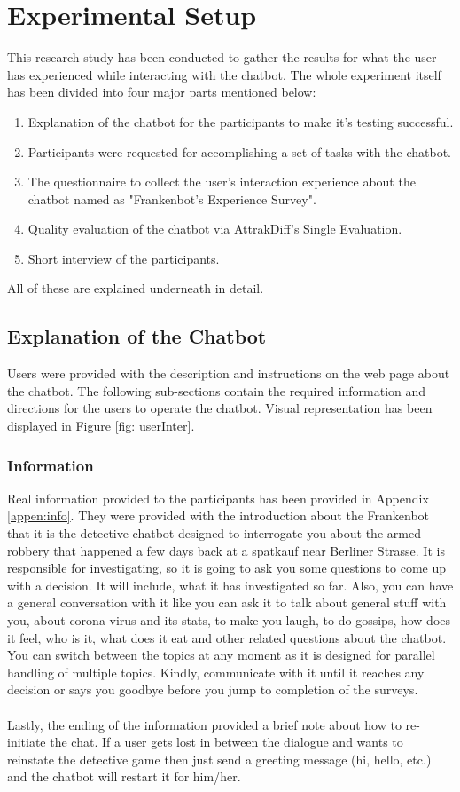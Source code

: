 \section{Experimental Setup}
This research study has been conducted to gather the results for what the user has experienced while interacting with the chatbot. The whole experiment itself has been divided into four major parts mentioned below:
\begin{enumerate}
    \item Explanation of the chatbot for the participants to make it's testing successful.
    \item Participants were requested for accomplishing a set of tasks with the chatbot.
    \item The questionnaire to collect the user's interaction experience about the chatbot named as "Frankenbot's Experience Survey".
    \item Quality evaluation of the chatbot via AttrakDiff's Single Evaluation.
    \item Short interview of the participants.
\end{enumerate} 
All of these are explained underneath in detail.

\subsection{Explanation of the Chatbot}
Users were provided with the description and instructions on the web page about the chatbot. The following sub-sections contain the required information and directions for the users to operate the chatbot. Visual representation has been displayed in Figure \ref{fig: userInter}.

\subsubsection*{Information}
Real information provided to the participants has been provided in Appendix \ref{appen:info}. They were provided with the introduction about the Frankenbot that it is the detective chatbot designed to interrogate you about the armed robbery that happened a few days back at a spatkauf near Berliner Strasse. It is responsible for investigating, so it is going to ask you some questions to come up with a decision. It will include, what it has investigated so far. Also, you can have a general conversation with it like you can ask it to talk about general stuff with you, about corona virus and its stats, to make you laugh, to do gossips, how does it feel, who is it, what does it eat and other related questions about the chatbot. You can switch between the topics at any moment as it is designed for parallel handling of multiple topics. Kindly, communicate with it until it reaches any decision or says you goodbye before you jump to completion of the surveys.
\\~\\
Lastly, the ending of the information provided a brief note about how to re-initiate the chat. If a user gets lost in between the dialogue and wants to reinstate the detective game then just send a greeting message (hi, hello, etc.) and the chatbot will restart it for him/her. 

